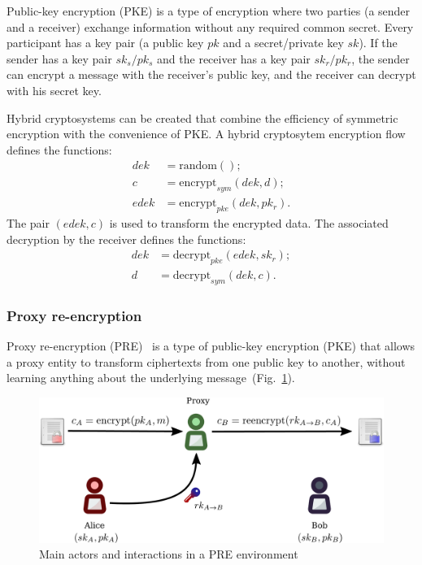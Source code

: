 \documentclass[longbibliography,nofootinbib]{revtex4-1}
\newcommand{\figref}[1]{Fig.~\ref{#1}}
\begin{document}
Public-key encryption (PKE) is a type of encryption where two parties (a sender and a receiver) exchange information without any required common secret.
Every participant has a key pair (a public key $pk$ and a secret/private key $sk$).
If the sender has a key pair $sk_s/pk_s$ and the receiver has a key pair $sk_r/pk_r$, the sender can encrypt a message with the receiver's public key,
and the receiver can decrypt with his secret key.

Hybrid cryptosystems can be created that combine the efficiency of symmetric encryption with the convenience of PKE.
A hybrid cryptosytem encryption flow defines the functions:
\begin{align}
    dek &= \text{random}();\\
    c &= \text{encrypt}_{sym}(dek, d);\\
    edek &= \text{encrypt}_{pke}(dek, pk_r).
\end{align}
The pair $(edek, c)$ is used to transform the encrypted data.
The associated decryption by the receiver defines the functions:
\begin{align}
    dek &= \text{decrypt}_{pke}(edek, sk_r);\\
    d &= \text{decrypt}_{sym}(dek, c).
\end{align}

\subsubsection{Proxy re-encryption}
Proxy re-encryption (PRE)~\cite{wiki:pre,nunez2017proxy} is a type of public-key encryption (PKE) that allows a proxy entity to transform ciphertexts
from one public key to another, without learning anything about the underlying message~(\figref{fig:pre}).

\begin{figure}
\centering
    \includegraphics[width=0.6\columnwidth]{pdf/pre.pdf}
    \caption{Main actors and interactions in a PRE environment}
    \label{fig:pre}
\end{figure}
\end{document}
